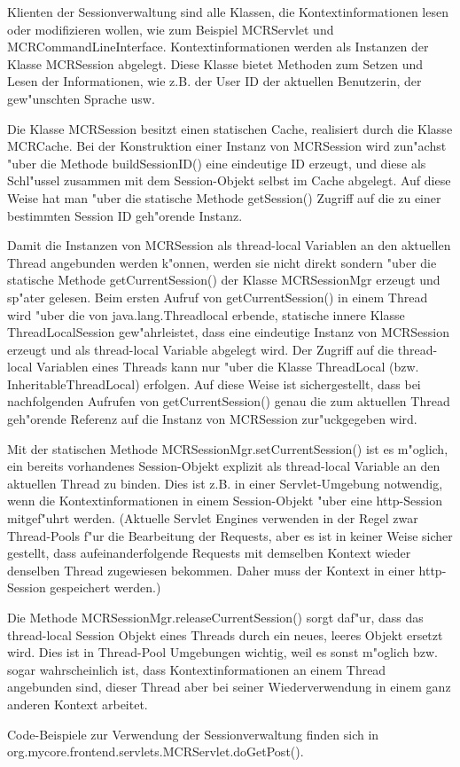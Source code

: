 Klienten der Sessionverwaltung sind alle Klassen, die Kontextinformationen lesen oder
modifizieren wollen, wie zum Beispiel MCRServlet und MCRCommandLineInterface.
Kontextinformationen werden als Instanzen der Klasse MCRSession abgelegt.
Diese Klasse bietet Methoden zum Setzen und Lesen der Informationen, wie z.B.
der User ID der aktuellen Benutzerin, der gew"unschten Sprache usw. 

Die Klasse MCRSession besitzt einen statischen Cache, realisiert durch die Klasse MCRCache.
Bei der Konstruktion einer Instanz von MCRSession wird zun"achst "uber die Methode 
buildSessionID() eine eindeutige ID erzeugt, und diese als Schl"ussel zusammen
mit dem Session-Objekt selbst im Cache abgelegt.
Auf diese Weise hat man "uber die statische Methode getSession() Zugriff auf die zu
einer bestimmten Session ID geh"orende Instanz.

Damit die Instanzen von MCRSession als thread-local Variablen an den aktuellen
Thread angebunden werden k"onnen, werden sie nicht direkt sondern "uber die
statische Methode getCurrentSession() der Klasse MCRSessionMgr erzeugt und sp"ater gelesen.
Beim ersten Aufruf von getCurrentSession() in einem Thread wird "uber die von 
java.lang.Threadlocal erbende, statische innere Klasse ThreadLocalSession gew"ahrleistet, 
dass eine eindeutige Instanz von MCRSession erzeugt und als thread-local Variable
abgelegt wird.
Der Zugriff auf die thread-local Variablen eines Threads kann nur "uber die Klasse
ThreadLocal (bzw. InheritableThreadLocal) erfolgen.
Auf diese Weise ist sichergestellt, dass bei nachfolgenden Aufrufen von getCurrentSession()
genau die zum aktuellen Thread geh"orende Referenz auf die Instanz von MCRSession 
zur"uckgegeben wird. 

Mit der statischen Methode MCRSessionMgr.setCurrentSession() ist es m"oglich, ein 
bereits vorhandenes Session-Objekt explizit als thread-local Variable an den aktuellen
Thread zu binden.
Dies ist z.B. in einer Servlet-Umgebung notwendig, wenn die Kontextinformationen in
einem Session-Objekt "uber eine http-Session mitgef"uhrt werden.
(Aktuelle Servlet Engines verwenden in der Regel zwar Thread-Pools f"ur die Bearbeitung 
der Requests, aber es ist in keiner Weise sicher gestellt, dass aufeinanderfolgende
Requests mit demselben Kontext wieder denselben Thread zugewiesen bekommen.
Daher muss der Kontext in einer http-Session gespeichert werden.)

Die Methode MCRSessionMgr.releaseCurrentSession() sorgt daf"ur, dass das thread-local
Session Objekt eines Threads durch ein neues, leeres Objekt ersetzt wird.
Dies ist in Thread-Pool Umgebungen wichtig, weil es sonst m"oglich bzw. sogar 
wahrscheinlich ist, dass Kontextinformationen an einem Thread angebunden sind, dieser 
Thread aber bei seiner Wiederverwendung in einem ganz anderen Kontext arbeitet.
 
Code-Beispiele zur Verwendung der Sessionverwaltung finden sich in\\ 
org.mycore.frontend.servlets.MCRServlet.doGetPost().